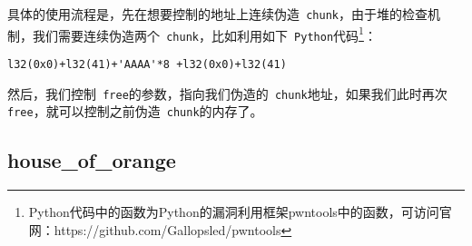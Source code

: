 具体的使用流程是，先在想要控制的地址上连续伪造\verb+ chunk+，由于堆的检查机制，我们需要连续伪造两个\verb+ chunk+，比如利用如下\verb+ Python+代码\footnote{Python代码中的函数为Python的漏洞利用框架pwntools中的函数，可访问官网：https://github.com/Gallopsled/pwntools}：
\begin{verbatim}
l32(0x0)+l32(41)+'AAAA'*8 +l32(0x0)+l32(41)
\end{verbatim}

然后，我们控制\verb+ free+的参数，指向我们伪造的\verb+ chunk+地址，如果我们此时再次\verb+ free+，就可以控制之前伪造\verb+ chunk+的内存了。

\subsection{house\_of\_orange}

